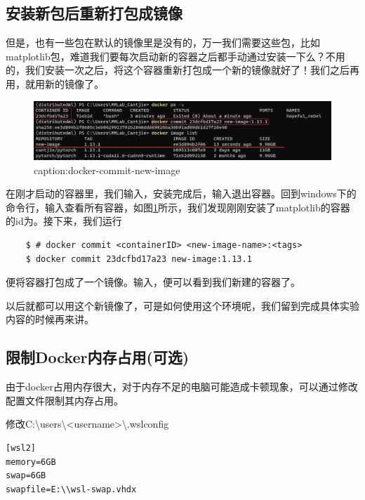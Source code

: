 \subsection{安装新包后重新打包成镜像}\label{subsec:container-to-image}

但是，也有一些包在默认的镜像里是没有的，万一我们需要这些包，比如matplotlib包，难道我们要每次启动新的容器之后都手动通过安装一下么？不用的，我们安装一次之后，将这个容器重新打包成一个新的镜像就好了！我们之后再用，就用新的镜像了。

\begin{figure}[htbp]
	\centering
	\includegraphics[width=1\textwidth]{figures/docker-commit-new-image.png}
	\caption{caption:docker-commit-new-image}
	\label{fig:docker-commit-new-image}
\end{figure}

在刚才启动的容器里，我们输入，安装完成后，输入退出容器。回到windows下的命令行，输入查看所有容器，如图\ref{fig:docker-commit-new-image}所示，我们发现刚刚安装了matplotlib的容器的id为。接下来，我们运行
\begin{lstlisting}
	$ # docker commit <containerID> <new-image-name>:<tags>
	$ docker commit 23dcfbd17a23 new-image:1.13.1
\end{lstlisting}
便将容器打包成了一个镜像。输入，便可以看到我们新建的容器了。

以后就都可以用这个新镜像了，可是如何使用这个环境呢，我们留到完成具体实验内容的时候再来讲。

\subsection{限制Docker内存占用(可选)}

由于docker占用内存很大，对于内存不足的电脑可能造成卡顿现象，可以通过修改配置文件限制其内存占用。

修改C:\textbackslash users\textbackslash<username>\textbackslash .wslconfig 

\begin{lstlisting}
[wsl2]
memory=6GB
swap=6GB
swapfile=E:\\wsl-swap.vhdx
\end{lstlisting}



